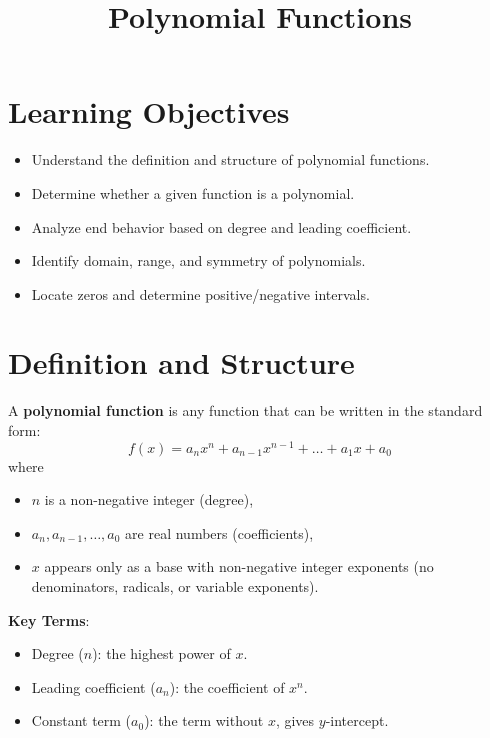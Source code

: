 \documentclass[12pt]{article}
\title{Polynomial Functions}
\author{}
\date{}
\begin{document}
\maketitle

\section*{Learning Objectives}
\begin{itemize}
  \item Understand the definition and structure of polynomial functions.
  \item Determine whether a given function is a polynomial.
  \item Analyze end behavior based on degree and leading coefficient.
  \item Identify domain, range, and symmetry of polynomials.
  \item Locate zeros and determine positive/negative intervals.
\end{itemize}

\section{Definition and Structure}
A \textbf{polynomial function} is any function that can be written in the standard form:
\[
  f(x) = a_n x^n + a_{n-1} x^{n-1} + \dots + a_1 x + a_0
\]
where
\begin{itemize}
  \item $n$ is a non-negative integer (degree),
  \item $a_n, a_{n-1}, \dots, a_0$ are real numbers (coefficients),
  \item $x$ appears only as a base with non-negative integer exponents (no denominators, radicals, or variable exponents).
\end{itemize}

\textbf{Key Terms}:
\begin{itemize}
  \item Degree ($n$): the highest power of $x$.
  \item Leading coefficient ($a_n$): the coefficient of $x^n$.
  \item Constant term ($a_0$): the term without $x$, gives $y$-intercept.
\end{itemize}
\end{document}
